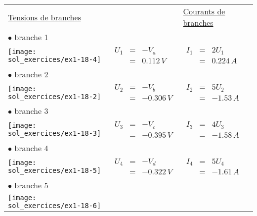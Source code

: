 \begin{tabular}{lll}
	\multicolumn{2}{l}{\underline{Tensions de branches}} & \underline{Courants de branches}\\[2mm]
	$\bullet$ branche 1 & & \\
	\parbox[c]{4cm}{\texttt{[image: sol\_exercices/ex1-18-4]}} 
	& $\begin{array}{rcl}
	U_{1} &=& -V_a \\ &=& 0.112\, V \end{array}$
	& $\begin{array}{rcl}
	I_{1} &=& 2U_{1} \\ &=& 0.224\, A \end{array}$ \\[14mm]
	$\bullet$ branche 2 & & \\
	\parbox[c]{4cm}{\texttt{[image: sol\_exercices/ex1-18-2]}}
	& $\begin{array}{rcl}
	U_{2} &=& -V_b \\ &=& -0.306\, V \end{array}$
	& $\begin{array}{rcl}
	I_{2} &=& 5U_{2} \\ &=& -1.53\, A \end{array}$ \\[20mm]
	$\bullet$ branche 3 & & \\
	\parbox[c]{4cm}{\texttt{[image: sol\_exercices/ex1-18-3]}}
	& $\begin{array}{rcl}
	U_{3} &=& -V_c \\ &=& -0.395\, V \end{array}$
	& $\begin{array}{rcl}
	I_{3} &=& 4U_{3} \\ &=& -1.58\, A \end{array}$ \\[20mm]
	$\bullet$ branche 4 & & \\
	\parbox[c]{4cm}{\texttt{[image: sol\_exercices/ex1-18-5]}}
	& $\begin{array}{rcl}
	U_{4} &=& -V_d \\ &=& -0.322\, V \end{array}$
	& $\begin{array}{rcl}
	I_{4} &=& 5U_{4} \\ &=& -1.61\, A \end{array}$ \\[20mm]
	$\bullet$ branche 5 & & \\
	\parbox[c]{4cm}{\texttt{[image: sol\_exercices/ex1-18-6]}}

\end{tabular}

